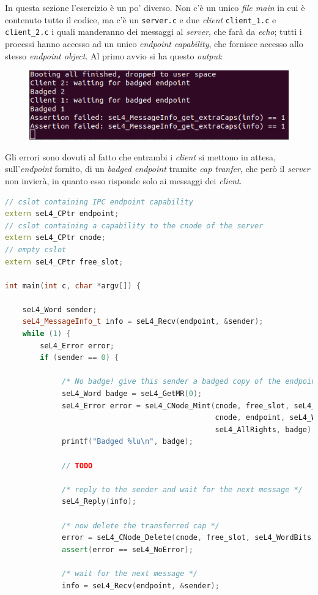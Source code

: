 In questa sezione l'esercizio è un po' diverso. Non c'è un unico \textit{file main} in cui è contenuto tutto il codice, ma c'è un \texttt{server.c} e due \textit{client} \texttt{client\_1.c} e \texttt{client\_2.c} i quali manderanno dei messaggi al \textit{server}, che farà da \textit{echo}; tutti i processi hanno accesso ad un unico \textit{endpoint capability}, che fornisce accesso allo stesso \textit{endpoint object}. Al primo avvio si ha questo \textit{output}:
\begin{figure}[H]
  \includegraphics[scale=0.7]{img/PrimoAvvioIPC2.png}%
  \centering
  \label{fig:PrimoAvvio}
\end{figure}

Gli errori sono dovuti al fatto che entrambi i \textit{client} si mettono in attesa, sull'\textit{endpoint} fornito, di un \textit{badged endpoint} tramite \textit{cap tranfer}, che però il \textit{server} non invierà, in quanto esso risponde solo ai messaggi dei \textit{client}.
\begin{lstlisting}[language=C++]
// cslot containing IPC endpoint capability
extern seL4_CPtr endpoint;
// cslot containing a capability to the cnode of the server
extern seL4_CPtr cnode;
// empty cslot
extern seL4_CPtr free_slot;

int main(int c, char *argv[]) {

	seL4_Word sender;
    seL4_MessageInfo_t info = seL4_Recv(endpoint, &sender);
    while (1) {
	    seL4_Error error;
        if (sender == 0) {

             /* No badge! give this sender a badged copy of the endpoint */
             seL4_Word badge = seL4_GetMR(0);
             seL4_Error error = seL4_CNode_Mint(cnode, free_slot, seL4_WordBits,
                                                cnode, endpoint, seL4_WordBits,
                                                seL4_AllRights, badge);
             printf("Badged %lu\n", badge);

             // TODO
             
             /* reply to the sender and wait for the next message */
             seL4_Reply(info);

             /* now delete the transferred cap */
             error = seL4_CNode_Delete(cnode, free_slot, seL4_WordBits);
             assert(error == seL4_NoError);

             /* wait for the next message */
             info = seL4_Recv(endpoint, &sender);
\end{lstlisting}

